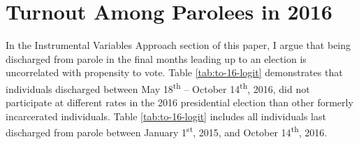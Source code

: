 \documentclass[
  12pt,
]{article}
\author{}
\date{\vspace{-2.5em}}
\begin{document}
{
\setcounter{tocdepth}{2}
\tableofcontents
}
\newpage
\doublespace

\hypertarget{turnout-among-parolees-in-2016}{%
\section*{Turnout Among Parolees in 2016}\label{turnout-among-parolees-in-2016}}

In the Instrumental Variables Approach section of this paper, I argue that being discharged from parole in the final months leading up to an election is uncorrelated with propensity to vote. Table \ref{tab:to-16-logit} demonstrates that individuals discharged between May 18\textsuperscript{th} -- October 14\textsuperscript{th}, 2016, did not participate at different rates in the 2016 presidential election than other formerly incarcerated individuals. Table \ref{tab:to-16-logit} includes all individuals last discharged from parole between January 1\textsuperscript{st}, 2015, and October 14\textsuperscript{th}, 2016.
\end{document}
